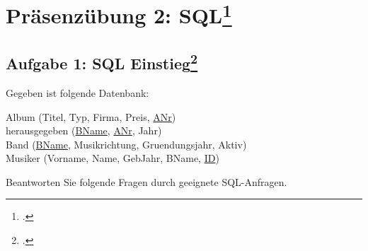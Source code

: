 \documentclass{lehramt-informatik-haupt}
\begin{document}
\chapter{Präsenzübung 2: SQL\footcite{db:pu:2}}

%

\section{Aufgabe 1: SQL Einstieg\footcite{db:pu:2}}

Gegeben ist folgende Datenbank: \bigskip

{
\ttfamily
\noindent
Album (Titel, Typ, Firma, Preis, \underline{ANr})\\
\noindent
herausgegeben (\underline{BName}, \underline{ANr}, Jahr)\\
\noindent
Band (\underline{BName}, Musikrichtung, Gruendungsjahr, Aktiv)\\
\noindent
Musiker (Vorname, Name, GebJahr, BName, \underline{ID})\\
}

\noindent
Beantworten Sie folgende Fragen durch geeignete SQL-Anfragen.
\end{document}
